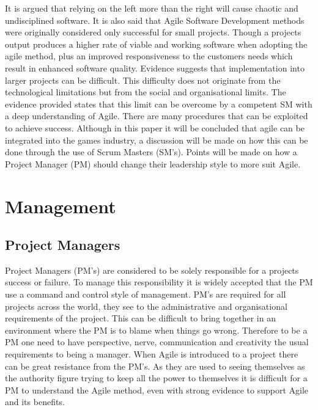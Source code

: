 \documentclass{scrartcl}
\begin{document}
It is argued that relying on the left more than the right will cause chaotic and undisciplined software\cite{ready,Chaos}. It is also said that Agile Software Development methods were originally considered only successful for small projects\cite{ready,extreme}. Though a projects output produces a higher rate of viable and working software when adopting the agile method, plus an improved responsiveness to the customers needs which result in enhanced software quality\cite{LeaderUnleashed,MasterActivities}. Evidence suggests that implementation into larger projects can be difficult\cite{MasterActivities}. This difficulty does not originate from the technological limitations but from the social and organisational limits\cite{SocialAgile}. The evidence provided states that this limit can be overcome by a competent SM with a deep understanding of Agile\cite{Together}. There are many procedures that can be exploited to achieve success. Although in this paper it will be concluded that agile can be integrated into the games industry, a discussion will be made on how this can be done through the use of Scrum Masters (SM's). Points will be made on how a Project Manager (PM) should change their leadership style to more suit Agile. 

\section{Management}


\subsection{Project Managers}
 
 Project Managers (PM's) are considered to be solely responsible for a projects success or failure\cite{Behavior}. To manage this responsibility it is widely accepted that the PM use a command and control style of management\cite{MasterActivities}. PM's are required for all projects across the world, they see to the administrative and organisational requirements of the project\cite{Oxymoron}. This can be difficult to bring together in an environment where the PM is to blame when things go wrong. Therefore to be a PM one need to have perspective, nerve, communication and creativity the usual requirements to being a manager\cite{Oxymoron}. When Agile is introduced to a project there can be great resistance from the PM's. As they are used to seeing themselves as the authority figure trying to keep all the power to themselves it is difficult for a PM to understand the Agile method\cite{Leader,ready}, even with strong evidence to support Agile and its benefits.
 
\end{document}
